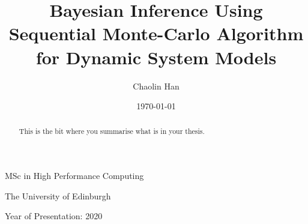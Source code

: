 \documentclass[12pt,a4paper]{report}
\begin{document}

\title{Bayesian Inference Using Sequential Monte-Carlo Algorithm for Dynamic System Models}

\author{Chaolin Han}

\date{\today}

\makeEPCCtitle

\thispagestyle{empty}

\vspace{11cm}

\begin{center}

    \large{MSc in High Performance Computing}

    \large{The University of Edinburgh}

    \large{Year of Presentation: 2020}

\end{center}

\newpage

\begin{abstract}
    This is the bit where you summarise what is in your thesis.
\end{abstract}


\tableofcontents
\listoftables
\listoffigures





\newpage

\end{document}
